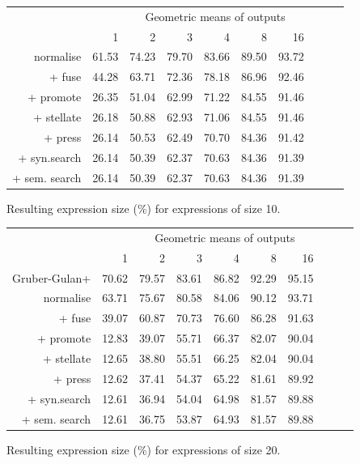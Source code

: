 \begin{figure}\begin{tabular}{rrrrrrrrrr}
 & \multicolumn{9}{c}{Geometric means of outputs} \\
 & 1 & 2 & 3 & 4 & 8 & 16 \\
normalise & 61.53 & 74.23 & 79.70 & 83.66 & 89.50 & 93.72 \\
+ fuse & 44.28 & 63.71 & 72.36 & 78.18 & 86.96 & 92.46 \\
+ promote & 26.35 & 51.04 & 62.99 & 71.22 & 84.55 & 91.46 \\
+ stellate & 26.18 & 50.88 & 62.93 & 71.06 & 84.55 & 91.46 \\
+ press & 26.14 & 50.53 & 62.49 & 70.70 & 84.36 & 91.42 \\
+ syn.search & 26.14 & 50.39 & 62.37 & 70.63 & 84.36 & 91.39 \\
+ sem. search & 26.14 & 50.39 & 62.37 & 70.63 & 84.36 & 91.39 \\
\end{tabular}\caption{Resulting expression size (\%) for expressions of size 10.}\end{figure}
\begin{figure}\begin{tabular}{rrrrrrrrrr}
 & \multicolumn{9}{c}{Geometric means of outputs} \\
 & 1 & 2 & 3 & 4 & 8 & 16 \\
Gruber-Gulan+ & 70.62 & 79.57 & 83.61 & 86.82 & 92.29 & 95.15 \\
normalise & 63.71 & 75.67 & 80.58 & 84.06 & 90.12 & 93.71 \\
+ fuse & 39.07 & 60.87 & 70.73 & 76.60 & 86.28 & 91.63 \\
+ promote & 12.83 & 39.07 & 55.71 & 66.37 & 82.07 & 90.04 \\
+ stellate & 12.65 & 38.80 & 55.51 & 66.25 & 82.04 & 90.04 \\
+ press & 12.62 & 37.41 & 54.37 & 65.22 & 81.61 & 89.92 \\
+ syn.search & 12.61 & 36.94 & 54.04 & 64.98 & 81.57 & 89.88 \\
+ sem. search & 12.61 & 36.75 & 53.87 & 64.93 & 81.57 & 89.88 \\
\end{tabular}\caption{Resulting expression size (\%) for expressions of size 20.}\end{figure}
